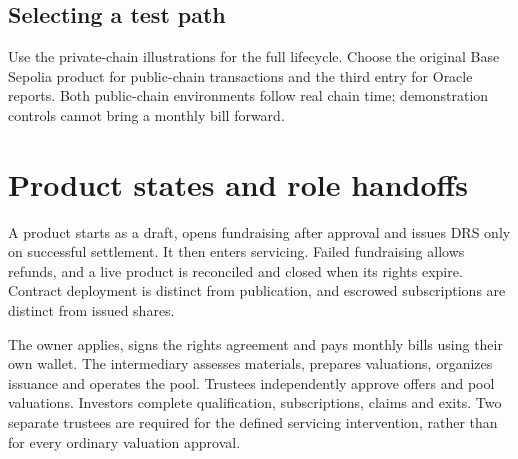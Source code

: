 \documentclass[12pt,a4paper]{article}
\begin{document}
\subsection{Selecting a test path}
\begin{center}\end{center}
Use the private-chain illustrations for the full lifecycle. Choose the original Base Sepolia product for public-chain transactions and the third entry for Oracle reports. Both public-chain environments follow real chain time; demonstration controls cannot bring a monthly bill forward.

\clearpage\section{Product states and role handoffs}
A product starts as a draft, opens fundraising after approval and issues DRS only on successful settlement. It then enters servicing. Failed fundraising allows refunds, and a live product is reconciled and closed when its rights expire. Contract deployment is distinct from publication, and escrowed subscriptions are distinct from issued shares.

The owner applies, signs the rights agreement and pays monthly bills using their own wallet. The intermediary assesses materials, prepares valuations, organizes issuance and operates the pool. Trustees independently approve offers and pool valuations. Investors complete qualification, subscriptions, claims and exits. Two separate trustees are required for the defined servicing intervention, rather than for every ordinary valuation approval.
\end{document}
